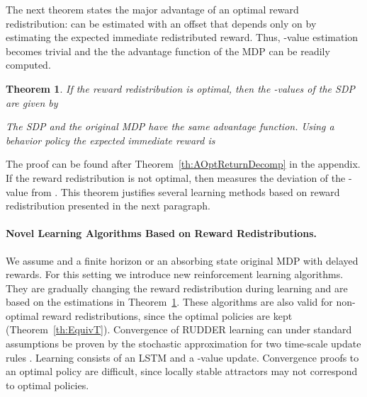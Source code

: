 \documentclass{article}
\newtheorem{theorem}{Theorem}
\begin{document}
The next theorem states the major advantage of an
optimal reward redistribution:
 can be estimated with an offset that 
depends only on  
by estimating the expected immediate redistributed reward.
Thus, -value estimation becomes trivial and the
the advantage function of the MDP  can be readily computed.
\begin{theorem}
\label{th:OptReturnDecomp}
If the reward redistribution is 
optimal, then the -values 
of the SDP  are given by 
 \vspace{-0.7cm}

The SDP  and the original MDP  
have the same advantage function.
Using a behavior policy 
 the expected immediate reward is

\end{theorem}
The proof can be found after Theorem~\ref{th:AOptReturnDecomp} in the appendix. 
If the reward redistribution is not optimal, then 
 measures the deviation of the -value 
from . 
This theorem justifies several learning methods based on
reward redistribution presented in the next paragraph.


\paragraph{Novel Learning Algorithms Based on Reward Redistributions.}
\label{c:novel}
We assume  and a finite horizon or an absorbing state
original MDP  with delayed rewards.
For this setting we introduce new reinforcement learning algorithms.
They are gradually changing 
the reward redistribution during learning and are
based on the estimations in Theorem~\ref{th:OptReturnDecomp}.
These algorithms are also valid for non-optimal reward redistributions,
since the optimal policies are kept (Theorem~\ref{th:EquivT}).
Convergence of RUDDER learning
can under standard assumptions be proven by the stochastic 
approximation for 
two time-scale update rules \cite{Borkar:97,Karmakar:17}.
Learning consists of an LSTM and a -value update.
Convergence proofs to an optimal policy are 
difficult, since locally stable attractors 
may not correspond to optimal policies.
\end{document}
